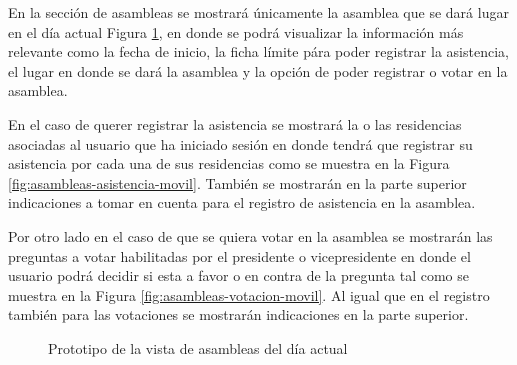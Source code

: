 En la sección de asambleas se mostrará únicamente la asamblea que se dará lugar en el día actual Figura \ref{fig:asambleas-movil}, en donde se podrá visualizar la información más relevante como la fecha de inicio, la ficha límite pára poder registrar la asistencia, el lugar en donde se dará la asamblea y la opción de poder registrar o votar en la asamblea.


En el caso de querer registrar la asistencia se mostrará la o las residencias asociadas al usuario que ha iniciado sesión en donde tendrá que registrar su asistencia por cada una de sus residencias como se muestra en la Figura \ref{fig:asambleas-asistencia-movil}.
También se mostrarán en la parte superior indicaciones a tomar en cuenta para el registro de asistencia en la asamblea.


Por otro lado en el caso de que se quiera votar en la asamblea se mostrarán las preguntas a votar habilitadas por el presidente o vicepresidente en donde el usuario podrá decidir si esta a favor o en contra de la pregunta tal como se muestra en la Figura \ref{fig:asambleas-votacion-movil}.
Al igual que en el registro también para las votaciones se mostrarán indicaciones en la parte superior.

\begin{figure}[H]
    \centering
    \caption{Prototipo de la vista de asambleas del día actual}
    \label{fig:asambleas-movil}
\end{figure}

